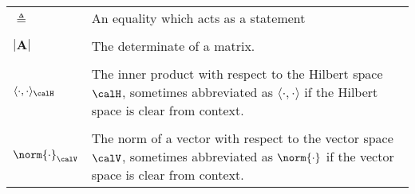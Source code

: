 \begin{longtable}{lp{}}
    $\triangleq$                                                                                               & An equality which acts as a statement                                                                                                                                                                                                                                                                                                                                                                                                                                                                                                                                                                                                                                                                                                                                                                                                                                                                                                             \\\\
    $\left| \bm{A} \right|$                                                                                    & The determinate of a matrix.                                                                                                                                                                                                                                                                                                                                                                                                                                                                                                                                                                                                                                                                                                                                                                                                                                                                                                                      \\\\
    $\langle \cdot , \cdot \rangle_{\calH}$                                                                    & The inner product with respect to the Hilbert space $\calH$, sometimes abbreviated as $\langle \cdot , \cdot \rangle$ if the Hilbert space is clear from context.
    \\\\
    $\norm{\cdot}_{\calV}$                                                                                     & The norm of a vector with respect to the vector space $\calV$, sometimes abbreviated as $\norm{\cdot}$ if the vector space is clear from context.

\end{longtable}
